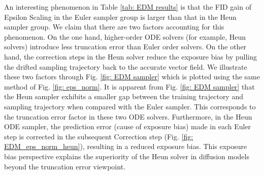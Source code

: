 \documentclass{article} \usepackage{iclr2024_conference,times}
\begin{document}
An interesting phenomenon in Table \ref{tab: EDM results} is that the FID gain of Epsilon Scaling in the Euler sampler group is larger than that in the Heun sampler group. We claim that there are two factors accounting for this phenomenon. On the one hand, higher-order ODE solvers (for example, Heun solvers) introduce less truncation error than Euler  order solvers. On the other hand, the correction steps in the Heun solver reduce the exposure bias by pulling the drifted sampling trajectory back to the accurate vector field. We illustrate these two factors through Fig. \ref{fig: EDM sampler} which is plotted using the same method of Fig. \ref{fig: eps_norm}. It is apparent from Fig. \ref{fig: EDM sampler} that the Heun sampler exhibits a smaller gap between the training trajectory and sampling trajectory when compared with the Euler sampler. This corresponds to the truncation error factor in these two ODE solvers. Furthermore, in the Heun  ODE sampler, the prediction error (cause of exposure bias) made in each Euler step is corrected in the subsequent Correction step (Fig. \ref{fig: EDM_eps_norm_heun}), resulting in a reduced exposure bias.
This exposure bias perspective explains the superiority of the Heun solver in diffusion models beyond the truncation error viewpoint.

\begin{figure*}[tbh]
\vskip -0.1in
\centering
\captionsetup{skip=2pt}
\caption{ during training and sampling on CIFAR-10.  We use 21-step sampling and report the L2-norm using 50k samples at each timestep. The sampling is from right to left in the figures.} 
\label{fig: EDM sampler}
\vskip -0.1in
\end{figure*}
\end{document}
